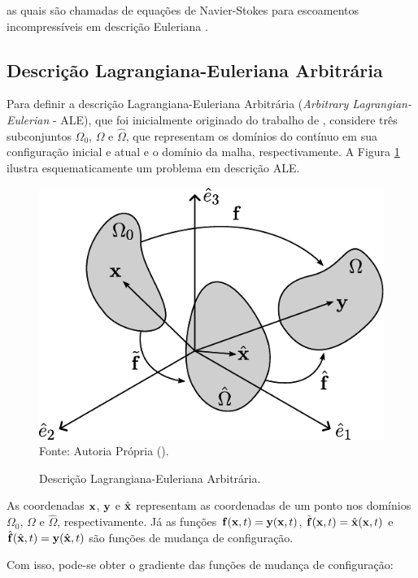 \documentclass[_ArquivoPrincipal.tex]{subfiles}
\begin{document}
as quais são chamadas de equações de Navier-Stokes para escoamentos incompressíveis em descrição Euleriana \cite{bazilevs2013computational,bazilevs2010large,bazilevs2007variational,hughes2002variational,hughes2000large}.

\subsection{Descrição Lagrangiana-Euleriana Arbitrária} \label{CFD-ALE}

Para definir a descrição Lagrangiana-Euleriana Arbitrária (\textit{Arbitrary Lagrangian-Eulerian} - ALE), que foi inicialmente originado do trabalho de , considere três subconjuntos $\Omega_0$, $\Omega$ e $\hat{\Omega}$, que representam os domínios do contínuo em sua configuração inicial e atual e o domínio da malha, respectivamente. A Figura \ref{Fig:ALE} ilustra esquematicamente um problema em descrição ALE.

\begin{figure}[h]
    \centering
    \caption{Descrição Lagrangiana-Euleriana Arbitrária.}
    \includegraphics[width=.55\linewidth]{Figuras/ALE.pdf}
    \label{Fig:ALE}
    \\Fonte: Autoria Própria (\the\year).
\end{figure}

As coordenadas $\mathbf{x}$, $\mathbf{y}$ e $\hat{\mathbf{x}}$ representam as coordenadas de um ponto nos domínios $\Omega_0$, $\Omega$ e $\hat{\Omega}$, respectivamente. Já as funções $\mathbf{f}(\mathbf{x},t)=\mathbf{y}(\mathbf{x},t)$, $\tilde{\mathbf{f}}(\mathbf{x},t)=\hat{\mathbf{x}}(\mathbf{x},t)$ e $\hat{\mathbf{f}}(\hat{\mathbf{x}},t)=\mathbf{y}(\hat{\mathbf{x}},t)$ são funções de mudança de configuração.

Com isso, pode-se obter o gradiente das funções de mudança de configuração:
\end{document}
